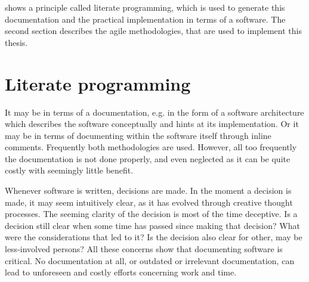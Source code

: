\documentclass[%
    a4paper,    %
    justified,  %
    nobib,      %
    openany     %
]{tufte-book}
\begin{document}
 shows a principle called literate
programming, which is used to generate this documentation and the practical
implementation in terms of a software. The second section describes the agile
methodologies, that are used to implement this thesis.

\section{Literate programming}
\label{sec:literate-programming}

 It may be in terms of
a documentation, e.g. in the form of a software architecture which
describes the software conceptually and hints at its implementation. Or it may
be in terms of documenting within the software itself through inline comments.
Frequently both methodologies are used. However, all too
frequently the documentation is not done properly, and even neglected as it can
be quite costly with seemingly little benefit.

 Whenever software is written,
decisions are made. In the moment a decision is made, it may seem intuitively
clear, as it has evolved through creative thought processes. The seeming clarity
of the decision is most of the time deceptive. Is a decision still clear when
some time has passed since making that decision? What were the considerations
that led to it? Is the decision also clear for other, may be less-involved
persons? All these concerns show that documenting software is critical. No
documentation at all, or outdated or irrelevant documentation, can lead to
unforeseen and costly efforts concerning work and time.
\end{document}
